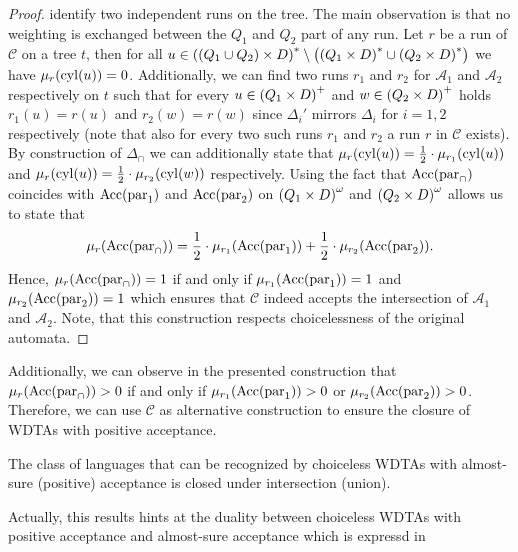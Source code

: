 \begin{proof}
  identify two independent runs on the tree. The main observation is that no
  weighting is exchanged between the $Q_{1}$ and $Q_{2}$ part of any run. Let
  $r$ be a run of $\mathcal{C}$ on a tree $t$, then for all $u\in \left(
    \left(Q_{1}\cup Q_{2}\right)\times D\right)^{*}\setminus\left(
    \left(Q_{1}\times D\right)^{*}\cup\left(Q_{2}\times D\right)^{*}\right)$ we have 
  $\mu_{r}(\operatorname{cyl}(u)) = 0$. Additionally, we can find two runs $r_{1}$ and 
  $r_{2}$ for $\mathcal{A}_{1}$ and $\mathcal{A}_{2}$ respectively on $t$ such
  that for every $u\in\left(Q_{1}\times D\right)^{+}$ and 
  $w\in\left(Q_{2}\times D\right)^{+}$ holds $r_{1}(u)=r(u)$ and $r_{2}(w)=r(w)$ 
  since $\Delta_{i}'$ mirrors $\Delta_{i}$ for $i= 1,2$ respectively (note that
  also for every two such runs $r_{1}$ and $r_{2}$ a run $r$ in $\mathcal{C}$
  exists). By construction of $\Delta_{\cap}$ we can additionally state that 
  $\mu_{r}(\operatorname{cyl}(u)) = \frac{1}{2}\cdot\mu_{r_{1}}(\operatorname{cyl}(u))$ and 
  $\mu_{r}(\operatorname{cyl}(u)) = \frac{1}{2}\cdot\mu_{r_{2}}(\operatorname{cyl}(w))$ respectively. Using
  the fact that $\operatorname{Acc}(\operatorname{par}_{\cap})$ coincides with $\operatorname{Acc}(\operatorname{par}_{1})$ and
  $\operatorname{Acc}(\operatorname{par}_{2})$ on $\left(Q_{1}\times D\right)^{\omega}$ and 
  $\left(Q_{2}\times D\right)^{\omega}$ allows us to state that
  \begin{equation*}
    \mu_{r}(\operatorname{Acc}(\operatorname{par}_{\cap})) = 
      \frac{1}{2}\cdot\mu_{r_{1}}(\operatorname{Acc}(\operatorname{par}_{1})) 
    + \frac{1}{2}\cdot\mu_{r_{2}}(\operatorname{Acc}(\operatorname{par}_{2})).
  \end{equation*}
  Hence, $\mu_{r}(\operatorname{Acc}(\operatorname{par}_{\cap})) = 1$ if and only if 
  $\mu_{r_{1}}(\operatorname{Acc}(\operatorname{par}_{1})) = 1$ and 
  $\mu_{r_{2}}(\operatorname{Acc}(\operatorname{par}_{2})) = 1$ which ensures that $\mathcal{C}$ indeed
  accepts the intersection of $\mathcal{A}_{1}$ and $\mathcal{A}_{2}$. Note,
  that this construction respects choicelessness of the original automata.
\end{proof}
Additionally, we can observe in the presented construction that
$\mu_{r}(\operatorname{Acc}(\operatorname{par}_{\cap})) > 0$ if and only if
$\mu_{r_{1}}(\operatorname{Acc}(\operatorname{par}_{1}))>0$ or $\mu_{r_{2}}(\operatorname{Acc}(\operatorname{par}_{2}))>0$.
Therefore, we can use $\mathcal{C}$ as alternative construction to ensure the
closure of \acp{WDTA} with positive acceptance.
\begin{corollary}
  The class of languages that can be recognized by choiceless \acp{WDTA} with
  almost-sure (positive) acceptance is closed under intersection (union).
\end{corollary}
Actually, this results hints at the duality between choiceless \acp{WDTA} with
positive acceptance and almost-sure acceptance which is expressd in
